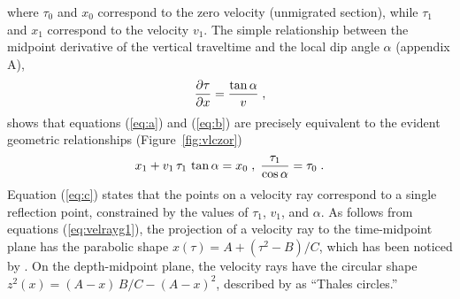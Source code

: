 where $\tau_0$ and $x_0$ correspond to the zero velocity (unmigrated
section), while $\tau_1$ and $x_1$ correspond to the velocity $v_1$.
The
simple relationship between the midpoint derivative of the vertical
traveltime and the local dip angle $\alpha$ (appendix A),
\begin{equation}
{{\partial \tau} \over {\partial x}} = 
{{\tan{\alpha}} \over v}\;,
\label{eq:dtaudx} 
\end{equation}
shows that equations (\ref{eq:a}) and (\ref{eq:b}) are precisely equivalent
to the evident geometric relationships (Figure~\ref{fig:vlczor})
\begin{equation}
x_1 + v_1\,\tau_1\,\tan{\alpha} = x_0\;,
\;{\tau_1 \over {\cos{\alpha}}} = \tau_0\;.
\label{eq:evident}
\end{equation}
Equation (\ref{eq:c}) states that the points on a velocity ray correspond
to a single reflection point, constrained by the values of $\tau_1$,
$v_1$, and $\alpha$.  As follows from equations (\ref{eq:velrayg1}), the
projection of a velocity ray to the time-midpoint plane has the
parabolic shape $x(\tau) = A + (\tau^2 - B) / C$, which has been
noticed by \cite{GEO46-05-07170733}. On the depth-midpoint plane, the
velocity rays have the circular shape $z^2(x) = (A - x)\,B / C - (A -
x)^2$, described by \cite{them} as ``Thales circles.''




